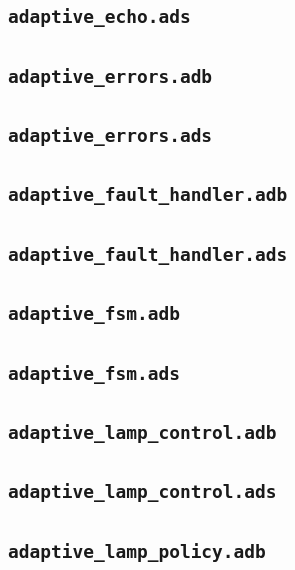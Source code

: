 \subsection*{\texttt{adaptive\_echo.ads}}

\subsection*{\texttt{adaptive\_errors.adb}}

\subsection*{\texttt{adaptive\_errors.ads}}

\subsection*{\texttt{adaptive\_fault\_handler.adb}}

\subsection*{\texttt{adaptive\_fault\_handler.ads}}

\subsection*{\texttt{adaptive\_fsm.adb}}

\subsection*{\texttt{adaptive\_fsm.ads}}

\subsection*{\texttt{adaptive\_lamp\_control.adb}}

\subsection*{\texttt{adaptive\_lamp\_control.ads}}

\subsection*{\texttt{adaptive\_lamp\_policy.adb}}

